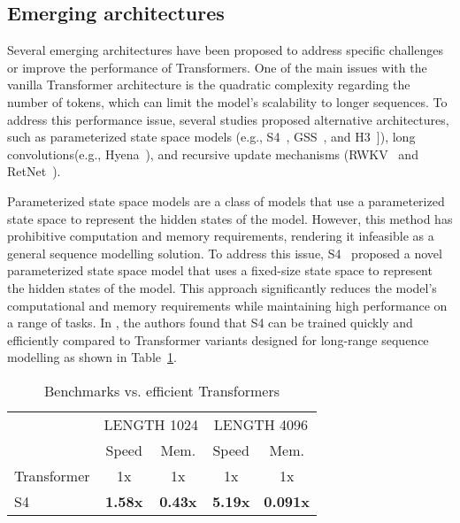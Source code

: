 \subsection{Emerging architectures}
\label{subsec:emerging-architectures}

Several emerging architectures have been proposed to address specific challenges or improve the performance of Transformers.
One of the main issues with the vanilla Transformer architecture is the quadratic complexity regarding the number of tokens, which can limit the model's scalability to longer sequences.
To address this performance issue, several studies proposed alternative architectures, such as parameterized state space models (e.g., S4~\cite{gu2022efficiently}, GSS~\cite{mehta2022long}, and H3~\cite{dao2022hungry}]), long convolutions(e.g., Hyena~\cite{poli2023hyena}), and recursive update mechanisms (RWKV~\cite{peng2023rwkv} and RetNet~\cite{sun2023retentive}).

Parameterized state space models are a class of models that use a parameterized state space to represent the hidden states of the model.
However, this method has prohibitive computation and memory requirements, rendering it infeasible as a general sequence modelling solution.
To address this issue, S4~\cite{gu2022efficiently} proposed a novel parameterized state space model that uses a fixed-size state space to represent the hidden states of the model.
This approach significantly reduces the model's computational and memory requirements while maintaining high performance on a range of tasks.
In \textcite{gu2022efficiently}, the authors found that S4 can be trained quickly and efficiently compared to Transformer variants designed for long-range sequence modelling as shown in Table~\ref{tab:ssm_efficiency}.

\begin{table}[htbp]
	\centering
	\begin{tabularx}{0.6\textwidth}{Xcccc}
		\toprule
		            & \multicolumn{2}{c}{LENGTH 1024} & \multicolumn{2}{c}{LENGTH 4096}                                    \\
		\cmidrule(lr){2-3} \cmidrule(lr){4-5}
		            & Speed                           & Mem.                            & Speed          & Mem.            \\
		\midrule
		Transformer & 1x                              & 1x                              & 1x             & 1x              \\
		S4          & \textbf{1.58x}                  & \textbf{0.43x}                  & \textbf{5.19x} & \textbf{0.091x} \\
		\bottomrule
	\end{tabularx}
	\caption{Benchmarks vs. efficient Transformers}
	\label{tab:ssm_efficiency}
\end{table}

